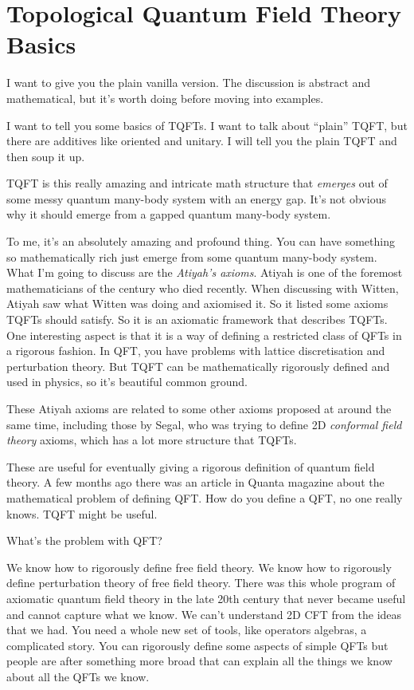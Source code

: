 \section{Topological Quantum Field Theory Basics}
I want to give you the plain vanilla version.
The discussion is abstract and mathematical,
but it's worth doing before moving into examples.

I want to tell you some basics of TQFTs.
I want to talk about ``plain'' TQFT,
but there are additives like oriented and unitary.
I will tell you the plain TQFT and then soup it up.

TQFT is this really amazing and intricate math structure that \emph{emerges} out
of some messy quantum many-body system with an energy gap.
It's not obvious why it should emerge from a gapped quantum many-body system.

To me, it's an absolutely amazing and profound thing.
You can have something so mathematically rich just emerge from some quantum
many-body system.
What I'm going to discuss are the \emph{Atiyah's axioms}.
Atiyah is one of the foremost mathematicians of the century
who died recently.
When discussing with Witten,
Atiyah saw what Witten was doing and axiomised it.
So it listed some axioms TQFTs should satisfy.
So it is an axiomatic framework that describes TQFTs.
One interesting aspect is that it is a way of defining a restricted class of
QFTs in a rigorous fashion.
In QFT, you have problems with lattice discretisation and perturbation theory.
But TQFT can be mathematically rigorously defined and used in physics,
so it's beautiful common ground.

These Atiyah axioms are related to some other axioms proposed at around the same
time, including those by Segal,
who was trying to define 2D \emph{conformal field theory} axioms,
which has a lot more structure that TQFTs.

These are useful for eventually giving a rigorous definition of quantum field
theory.
A few months ago there was an article in Quanta magazine about the mathematical
problem of defining QFT.\@
How do you define a QFT,
no one really knows.
TQFT might be useful.

\begin{question}
    What's the problem with QFT?\@
\end{question}
We know how to rigorously define free field theory.
We know how to rigorously define perturbation theory of free field theory.
There was this whole program of axiomatic quantum field theory in the late 20th
century that never became useful and cannot capture what we know.
We can't understand 2D CFT from the ideas that we had.
You need a whole new set of tools,
like operators algebras, a complicated story.
You can rigorously define some aspects of simple QFTs
but people are after something more broad
that can explain all the things we know about all the QFTs we know.


